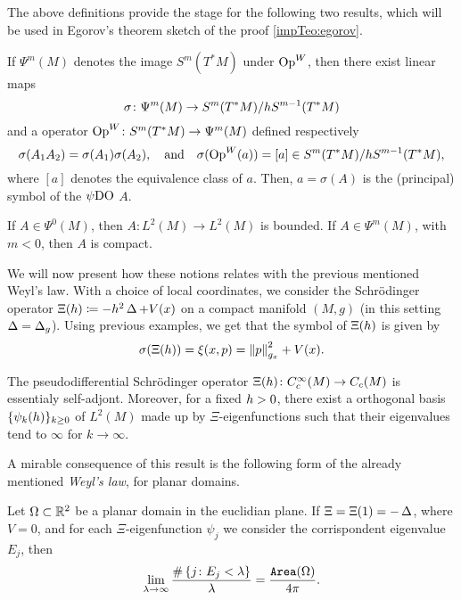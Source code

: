 The above definitions provide the stage for the following two results, which will be used in Egorov's theorem sketch of the proof \ref{impTeo:egorov}.


\begin{nteo}
\label{teo:quant_on_manifold}
If $\Psi^{m}(M)$ denotes the image $S^{m}(T^{\ast}M)$ under $\operatorname{Op}^{W}$, then there exist linear maps
\[
\sigma\colon \Psi^{m}(M)\to S^{m}(T^{\ast}M)/h S^{m-1}(T^{\ast}M)
\]
and a  operator $\operatorname{Op}^{W}\colon S^{m}(T^{\ast}M)\to\Psi^{m}(M)$ defined respectively
\[
\sigma(A_{1}A_{2})=\sigma(A_{1})\sigma(A_{2}),\quad\text{and}\quad\sigma(\operatorname{Op}^{W}(a))=[a]\in S^{m}(T^{\ast}M)/h S^{m-1}(T^{\ast}M),
\]
where $[a]$ denotes the equivalence class of $a$. Then, $a=\sigma(A)$ is the (principal) symbol of the $\operatorname{\psi DO}$ $A$.
\end{nteo}

\begin{nteo}
\label{teo:prop_PDO}
If $A\in\Psi^{0}(M)$, then $A\colon L^{2}(M)\to L^{2}(M)$ is bounded. If $A\in\Psi^{m}(M)$, with $m<0$, then $A$ is compact.
\end{nteo}


We will now present how these notions relates with the previous mentioned Weyl's law. With a choice of local coordinates, we consider the Schr{\"o}dinger operator $\Xi(h)\coloneqq -h^{2}\operatorname{\Delta}+V(x)$ on a compact manifold $(M,g)$ (in this setting $\operatorname{\Delta}=\operatorname{\Delta}_{g}$). Using previous examples, we get that the symbol of $\Xi(h)$ is given by 
\[
\sigma(\Xi(h))=\operatorname{\xi}(x,p)=\left\lVert p\right\rVert^{2}_{g_{x}}+V(x).
\]

\begin{nteo}
\label{teo:eigenf_of_xi_schord_operator}
The pseudodifferential Schr{\"o}dinger operator $\Xi(h)\colon C^{\infty}_{c}(M)\to C_{c}(M)$ is essentialy self-adjont. Moreover, for a fixed $h>0$, there exist a orthogonal basis $\{\psi_{k}(h)\}_{k\geq0}$ of $L^{2}(M)$ made up by $\Xi$-eigenfunctions such that their eigenvalues tend to $\infty$ for $k\to\infty$.
\end{nteo}

A mirable consequence of this result is the following form of the already mentioned \emph{Weyl's law}, for planar domains.

\begin{nteo}
\label{teo:weyl_law_new_planar_version}
Let $\Omega\subset\mathbb{R}^{2}$ be a planar domain in the euclidian plane. If $\Xi = \Xi(1)=-\operatorname{\Delta}$, where $V=0$, and for each $\Xi$-eigenfunction $\psi_{j}$ we consider the corrispondent eigenvalue $E_{j}$, then
\[
\lim_{\lambda\to\infty}\frac{\#\left\{ j\colon E_{j}<\lambda\right\} }{\lambda}=\frac{\operatorname{\mathtt{Area}}(\Omega)}{4\pi}.
\]
\end{nteo}



